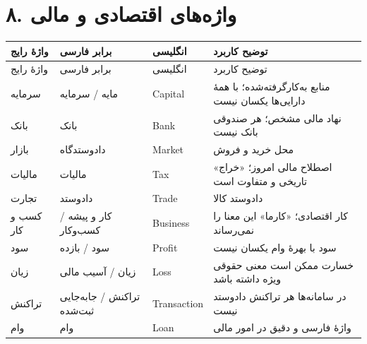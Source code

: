 \documentclass[a4paper,12pt,openany]{book}
\begin{document}
\section*{۸. واژه‌های اقتصادی و مالی}
\begingroup
\small
\setlength{\tabcolsep}{4pt}
\renewcommand{\arraystretch}{1.25}
\begin{longtable}{|p{2.5cm}|p{4.0cm}|p{2.3cm}|p{5.3cm}|}
\hline
واژهٔ رایج & برابر فارسی & انگلیسی & توضیح کاربرد \\
\hline
\endfirsthead
\hline
واژهٔ رایج & برابر فارسی & انگلیسی & توضیح کاربرد \\
\hline
\endhead
سرمایه & مایه / سرمایه & \textenglish{Capital} & منابع به‌کارگرفته‌شده؛ با همهٔ دارایی‌ها یکسان نیست \\
بانک & بانک & \textenglish{Bank} & نهاد مالی مشخص؛ هر صندوقی بانک نیست \\
بازار & دادوستدگاه & \textenglish{Market} & محل خرید و فروش \\
مالیات & مالیات & \textenglish{Tax} & اصطلاح مالی امروز؛ «خراج» تاریخی و متفاوت است \\
تجارت & دادوستد & \textenglish{Trade} & دادوستد کالا \\
کسب و کار & کار و پیشه / کسب‌وکار & \textenglish{Business} & کار اقتصادی؛ «کارما» این معنا را نمی‌رساند \\
سود & سود / بازده & \textenglish{Profit} & سود با بهرهٔ وام یکسان نیست \\
زیان & زیان / آسیب مالی & \textenglish{Loss} & خسارت ممکن است معنی حقوقی ویژه داشته باشد \\
تراکنش & تراکنش / جابه‌جایی ثبت‌شده & \textenglish{Transaction} & در سامانه‌ها هر تراکنش دادوستد نیست \\
وام & وام & \textenglish{Loan} & واژهٔ فارسی و دقیق در امور مالی \\
\hline
\end{longtable}
\endgroup
\end{document}
